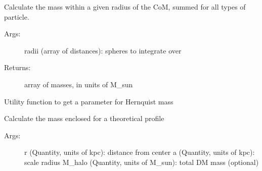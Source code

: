\documentclass[letterpaper,10pt,english]{sphinxmanual}
\begin{document}
\begin{fulllineitems}
\begin{fulllineitems}
\begin{description}
\end{description}

\end{fulllineitems}


\begin{fulllineitems}
\label{\detokenize{massprofile:galaxy.massprofile.MassProfile.mass_enclosed_total}}
Calculate the mass within a given radius of the CoM, 
summed for all types of particle.
\begin{description}
\item[{Args:}] \leavevmode
radii (array of distances): spheres to integrate over

\item[{Returns:}] \leavevmode
array of masses, in units of M\_sun

\end{description}

\end{fulllineitems}


\begin{fulllineitems}
\label{\detokenize{massprofile:galaxy.massprofile.MassProfile.halo_mass}}
Utility function to get a parameter for Hernquist mass

\end{fulllineitems}


\begin{fulllineitems}
\label{\detokenize{massprofile:galaxy.massprofile.MassProfile.hernquist_mass}}
Calculate the mass enclosed for a theoretical profile
\begin{description}
\item[{Args:}] \leavevmode
r (Quantity, units of kpc): distance from center
a (Quantity, units of kpc): scale radius
M\_halo (Quantity, units of M\_sun): total DM mass (optional)


\end{description}
\end{fulllineitems}
\end{fulllineitems}
\end{document}
